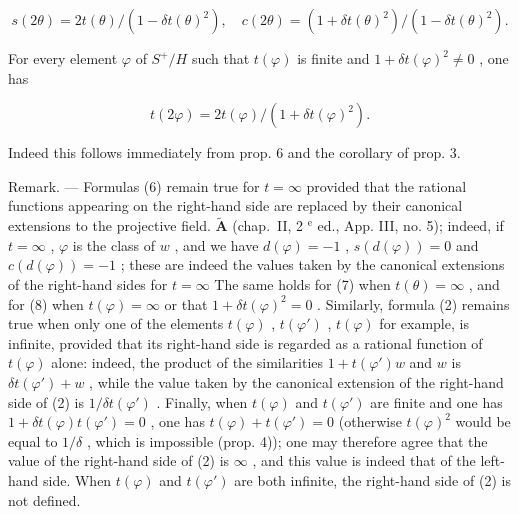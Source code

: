 \[
s (2 \theta) = 2 t (\theta) / (1 - \delta t (\theta) ^ {2}), \quad c (2 \theta) = (1 + \delta t (\theta) ^ {2}) / (1 - \delta t (\theta) ^ {2}). \tag {7}
\]

For every element \(\varphi\) of \(S^{+}/H\) such that \(t(\varphi)\) is finite and \(1 + \delta t(\varphi)^{2} \neq 0\) , one has

\[
t (2 \varphi) = 2 t (\varphi) / (1 + \delta t (\varphi) ^ {2}).\tag{8}
\]

Indeed this follows immediately from prop. 6 and the corollary of prop. 3.

Remark. --- Formulas (6) remain true for \(t = \infty\) provided that the rational functions appearing on the right-hand side are replaced by their canonical extensions to the projective field. \(\tilde{\mathbf{A}}\) (chap.~II, 2 \(^{\text{e}}\) ed., App. III, no. 5); indeed, if \(t = \infty\) , \(\varphi\) is the class of \(w\) , and we have \(d(\varphi) = -1\) , \(s(d(\varphi)) = 0\) and \(c(d(\varphi)) = -1\) ; these are indeed the values taken by the canonical extensions of the right-hand sides for \(t = \infty\) The same holds for (7) when \(t(\theta) = \infty\) , and for (8) when \(t(\varphi) = \infty\) or that \(1 + \delta t(\varphi)^{2} = 0\) . Similarly, formula (2) remains true when only one of the elements \(t(\varphi)\) , \(t(\varphi')\) , \(t(\varphi)\) for example, is infinite, provided that its right-hand side is regarded as a rational function of \(t(\varphi)\) alone: indeed, the product of the similarities \(1 + t(\varphi')w\) and \(w\) is \(\delta t(\varphi') + w\) , while the value taken by the canonical extension of the right-hand side of (2) is \(1/\delta t(\varphi')\) . Finally, when \(t(\varphi)\) and \(t(\varphi')\) are finite and one has \(1 + \delta t(\varphi)t(\varphi') = 0\) , one has \(t(\varphi) + t(\varphi') = 0\) (otherwise \(t(\varphi)^{2}\) would be equal to \(1/\delta\) , which is impossible (prop. 4)); one may therefore agree that the value of the right-hand side of (2) is \(\infty\) , and this value is indeed that of the left-hand side. When \(t(\varphi)\) and \(t(\varphi')\) are both infinite, the right-hand side of (2) is not defined.

